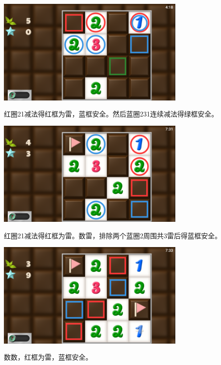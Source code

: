 \subsection{} %
\begin{center}
    \includegraphics[width=0.7\textwidth]{puzzle/43-1.png}
\end{center}
红圈21减法得红框为雷，蓝框安全。然后蓝圈231连续减法得绿框安全。
\begin{center}
    \includegraphics[width=0.7\textwidth]{puzzle/43-2.png}
\end{center}
红圈21减法得红框为雷。数雷，排除两个蓝圈2周围共3雷后得蓝框安全。
\begin{center}
    \includegraphics[width=0.7\textwidth]{puzzle/43-3.png}
\end{center}
数数，红框为雷，蓝框安全。


